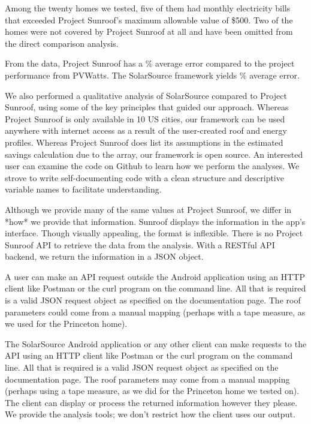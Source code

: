 \documentclass[pageno]{jpaper}
\begin{document}
Among the twenty homes we tested, five of them had monthly electricity bills that exceeded Project Sunroof's maximum allowable value of \$500. Two of the homes were not covered by Project Sunroof at all and have been omitted from the direct comparison analysis.

From the data, Project Sunroof has a \% average error compared to the project performance from PVWatts. The SolarSource framework yields \% average error.

We also performed a qualitative analysis of SolarSource compared to Project Sunroof, using some of the key principles that guided our approach. Whereas Project Sunroof is only available in 10 US cities, our framework can be used anywhere with internet access as a result of the user-created roof and energy profiles. Whereas Project Sunroof does list its assumptions in the estimated savings calculation due to the array, our framework is open source. An interested user can examine the code on Github to learn how we perform the analyses. We strove to write self-documenting code with a clean structure and descriptive variable names to facilitate understanding.

Although we provide many of the same values at Project Sunroof, we differ in *how* we provide that information. Sunroof displays the information in the app's interface. Though visually appealing, the format is inflexible. There is no Project Sunroof API to retrieve the data from the analysis. With a RESTful API backend, we return the information in a JSON object. 

A user can make an API request outside the Android application using an HTTP client like Postman or the curl program on the command line. All that is required is a valid JSON request object as specified on the documentation page. The roof parameters could come from a manual mapping (perhaps with a tape measure, as we used for the Princeton home).

The SolarSource Android application or any other client can make requests to the API using an HTTP client like Postman or the curl program on the command line. All that is required is a valid JSON request object as specified on the documentation page. The roof parameters may come from a manual mapping (perhaps using a tape measure, as we did for the Princeton home we tested on). The client can display or process the returned information however they please. We provide the analysis tools; we don't restrict how the client uses our output.
\end{document}
